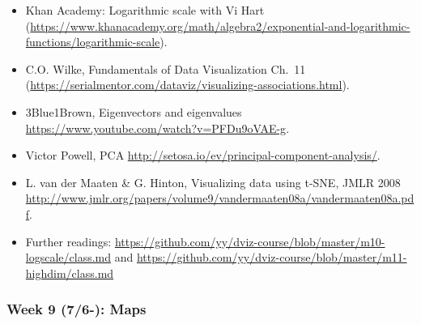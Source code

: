 \documentclass[11pt,article,oneside]{memoir} %
\begin{document}
\begin{itemize}\itemsep0em 
\item Khan Academy: Logarithmic scale with Vi Hart (\url{https://www.khanacademy.org/math/algebra2/exponential-and-logarithmic-functions/logarithmic-scale}). 
\item C.O. Wilke, Fundamentals of Data Visualization Ch.~11 (\url{https://serialmentor.com/dataviz/visualizing-associations.html}). 
\item 3Blue1Brown, Eigenvectors and eigenvalues \url{https://www.youtube.com/watch?v=PFDu9oVAE-g}. 
\item Victor Powell, PCA \url{http://setosa.io/ev/principal-component-analysis/}.
\item L. van der Maaten \& G. Hinton, Visualizing data using t-SNE, JMLR 2008 \url{http://www.jmlr.org/papers/volume9/vandermaaten08a/vandermaaten08a.pdf}.
\item Further readings: \url{https://github.com/yy/dviz-course/blob/master/m10-logscale/class.md} and \url{https://github.com/yy/dviz-course/blob/master/m11-highdim/class.md}
\end{itemize}	


\subsubsection{Week 9 (7/6-): Maps }%
\end{document}
